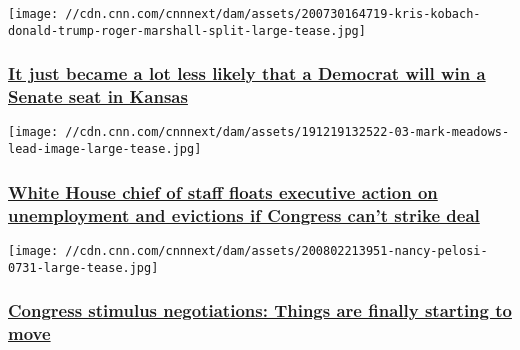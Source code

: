 \href{/2020/08/05/opinions/kansas-primary-election-kobach-marshall-stewart/index.html}{}

\texttt{[image: //cdn.cnn.com/cnnnext/dam/assets/200730164719-kris-kobach-donald-trump-roger-marshall-split-large-tease.jpg]}

\hypertarget{it-just-became-a-lot-less-likely-that-a-democrat-will-win-a-senate-seat-in-kansas}{%
\subsubsection{\texorpdfstring{\href{/2020/08/05/opinions/kansas-primary-election-kobach-marshall-stewart/index.html}{It
just became a lot less likely that a Democrat will win a Senate seat in
Kansas}}{It just became a lot less likely that a Democrat will win a Senate seat in Kansas}}\label{it-just-became-a-lot-less-likely-that-a-democrat-will-win-a-senate-seat-in-kansas}}

\href{/2020/08/05/politics/mark-meadows-unemployment-benefits-extension-coronavirus-relief-cnntv/index.html}{}

\texttt{[image: //cdn.cnn.com/cnnnext/dam/assets/191219132522-03-mark-meadows-lead-image-large-tease.jpg]}

\hypertarget{white-house-chief-of-staff-floats-executive-action-on-unemployment-and-evictions-if-congress-cant-strike-deal}{%
\subsubsection{\texorpdfstring{\href{/2020/08/05/politics/mark-meadows-unemployment-benefits-extension-coronavirus-relief-cnntv/index.html}{White
House chief of staff floats executive action on unemployment and
evictions if Congress can't strike
deal}}{White House chief of staff floats executive action on unemployment and evictions if Congress can't strike deal}}\label{white-house-chief-of-staff-floats-executive-action-on-unemployment-and-evictions-if-congress-cant-strike-deal}}

\href{/2020/08/05/politics/congress-stimulus-negotiations/index.html}{}

\texttt{[image: //cdn.cnn.com/cnnnext/dam/assets/200802213951-nancy-pelosi-0731-large-tease.jpg]}

\hypertarget{congress-stimulus-negotiations-things-are-finally-starting-to-move}{%
\subsubsection{\texorpdfstring{\href{/2020/08/05/politics/congress-stimulus-negotiations/index.html}{Congress
stimulus negotiations: Things are finally starting to
move}}{Congress stimulus negotiations: Things are finally starting to move}}\label{congress-stimulus-negotiations-things-are-finally-starting-to-move}}

